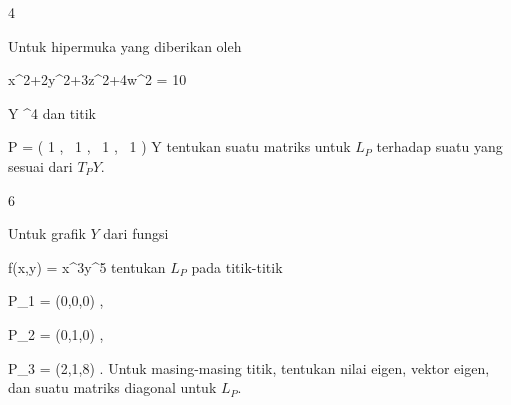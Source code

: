{4}
{

Untuk hipermuka yang diberikan oleh

\mavergleichskettedisp
{\vergleichskette
{ x^2+2y^2+3z^2+4w^2
}
{ =} { 10
}
{ } {
}
{ } {
}
{ } {
}
}
{}{}{}

\mavergleichskette
{\vergleichskette
{ Y
}
{ \subseteq }{ \R^4
}
{  }{
}
{    }{
}
{   }{
}
}
{}{}{}
dan titik

\mavergleichskettedisp
{\vergleichskette
{ P
}
{ =} { \left(  1  , \,   1  , \,   1 , \,   1                \right)
}
{ \in} { Y
}
{ } {
}
{ } {
}
}
{}{}{}
tentukan suatu matriks untuk
$L_P$ terhadap suatu
yang sesuai dari
$T_PY$.

}
{} {}

{6}
{

Untuk grafik $Y$ dari fungsi

\mavergleichskettedisp
{\vergleichskette
{ f(x,y)
}
{ =} { x^3y^5
}
{ } {
}
{ } {
}
{ } {
}
}
{}{}{}
tentukan
$L_P$ pada titik-titik

\mavergleichskette
{\vergleichskette
{ P_1
}
{ = }{ (0,0,0)
}
{  }{
}
{    }{
}
{   }{
}
}
{}{}{,}

\mavergleichskette
{\vergleichskette
{ P_2
}
{ = }{ (0,1,0)
}
{  }{
}
{    }{
}
{   }{
}
}
{}{}{,}

\mavergleichskette
{\vergleichskette
{ P_3
}
{ = }{ (2,1,8)
}
{  }{
}
{    }{
}
{   }{
}
}
{}{}{.}
Untuk masing-masing titik, tentukan nilai eigen, vektor eigen, dan suatu matriks diagonal untuk $L_P$.

}
{} {}
